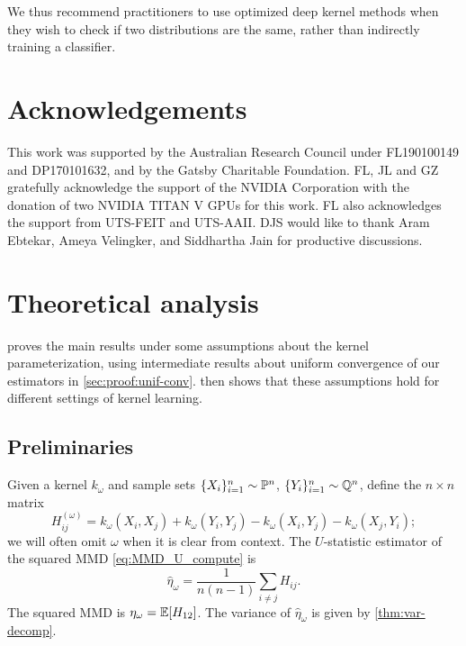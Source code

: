 \documentclass{article}
\begin{document}
We thus recommend practitioners to use optimized deep kernel methods when they wish to check if two distributions are the same, rather than indirectly training a classifier.

\ifdefined\isaccepted
\section*{Acknowledgements}
This work was supported by the Australian Research Council under FL190100149 and DP170101632, and
by the Gatsby Charitable Foundation.
FL, JL and GZ gratefully acknowledge the support of the NVIDIA Corporation with the donation of two NVIDIA TITAN V GPUs for this work. FL also acknowledges the support from UTS-FEIT and UTS-AAII.
DJS would like to thank Aram Ebtekar, Ameya Velingker, and Siddhartha Jain for productive discussions.
\fi





\clearpage
\onecolumn
\appendix

\section{Theoretical analysis}\label{Asec:proof}
 proves the main results under some assumptions about the kernel parameterization,
using intermediate results about uniform convergence of our estimators in \cref{sec:proof:unif-conv}.
 then shows that these assumptions hold for different settings of kernel learning.

\subsection{Preliminaries}
Given a kernel $k_\omega$ and sample sets $\{X_i\}_{i=1}^n \sim \P^n$, $\{Y_i\}_{i=1}^n \sim \Q^n$, define the $n \times n$ matrix
\[
    H_{ij}^{(\omega)} = k_\omega(X_i, X_j) + k_\omega(Y_i, Y_j) - k_\omega(X_i, Y_j) - k_\omega(X_j, Y_i)
;\]
we will often omit $\omega$ when it is clear from context.
The $U$-statistic estimator of the squared MMD \eqref{eq:MMD_U_compute} is
\[
    \hat\eta_\omega = \frac{1}{n (n-1)} \sum_{i \ne j} H_{ij}
.\]
The squared MMD is $\eta_\omega = \E[H_{12}]$.
The variance of $\hat\eta_\omega$ is given by \cref{thm:var-decomp}.
\end{document}
